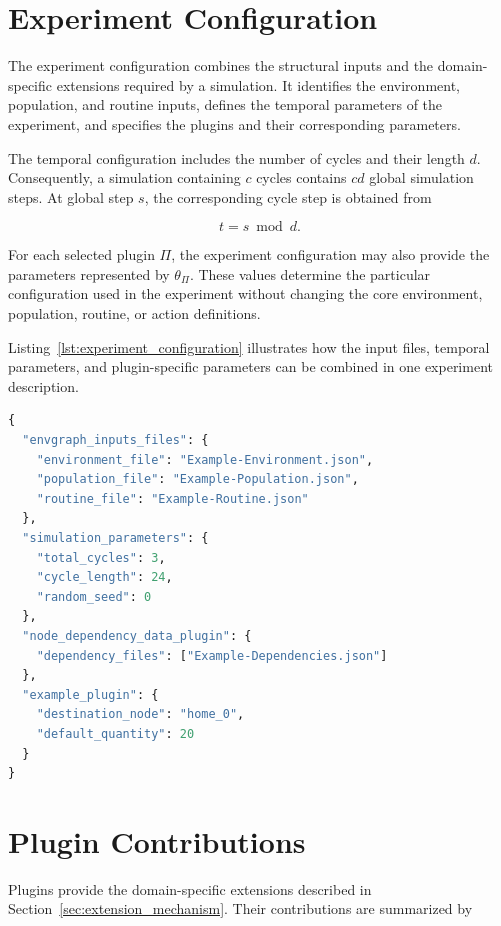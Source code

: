 \section{Experiment Configuration}
\label{app:experiment_configuration}

The experiment configuration combines the structural inputs and the domain-specific extensions required by a simulation. It identifies the environment, population, and routine inputs, defines the temporal parameters of the experiment, and specifies the plugins and their corresponding parameters. 

The temporal configuration includes the number of cycles and their length $d$. Consequently, a simulation containing $c$ cycles contains $cd$ global simulation steps. At global step $s$, the corresponding cycle step is obtained from 

\[ t=s\bmod d. \] 

For each selected plugin $\Pi$, the experiment configuration may also provide the parameters represented by $\theta_{\Pi}$. These values determine the particular configuration used in the experiment without changing the core environment, population, routine, or action definitions. 

Listing~\ref{lst:experiment_configuration} illustrates how the input files, temporal parameters, and plugin-specific parameters can be combined in one experiment description.

\begin{lstlisting}[language={Python},
caption={Example of an experiment configuration file.},
captionpos=b, label={lst:experiment_configuration}, basicstyle=\scriptsize]
{
  "envgraph_inputs_files": {
    "environment_file": "Example-Environment.json",
    "population_file": "Example-Population.json",
    "routine_file": "Example-Routine.json"
  },
  "simulation_parameters": {
    "total_cycles": 3,
    "cycle_length": 24,
    "random_seed": 0
  },
  "node_dependency_data_plugin": {
    "dependency_files": ["Example-Dependencies.json"]
  },
  "example_plugin": {
    "destination_node": "home_0",
    "default_quantity": 20
  }
}
\end{lstlisting}


\section{Plugin Contributions}
\label{app:plugin}

Plugins provide the domain-specific extensions described in Section~\ref{sec:extension_mechanism}. Their contributions are summarized by 

